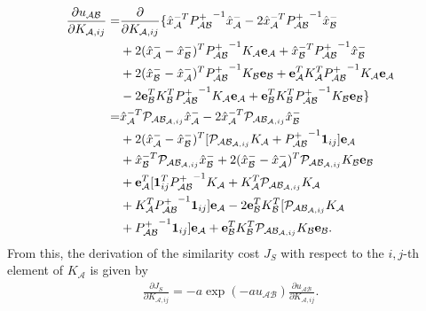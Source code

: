 \documentclass[10pt]{article}
\theoremstyle{plain}\theorembodyfont{\normalfont}
\begin{document}
\begin{align}
\begin{split}
\frac{\partial u_{\mathcal{A}\mathcal{B}}}{\partial K_{\mathcal{A},ij}}
=&\frac{\partial}{\partial K_{\mathcal{A},ij}}\{\hat x_\mathcal{A}^{-T}{P^+_{\mathcal{A}\mathcal{B}}}^{-1}\hat x_\mathcal{A}^-
-2\hat x_\mathcal{A}^{-T}{P^+_{\mathcal{A}\mathcal{B}}}^{-1}\hat x_\mathcal{B}^-
\\
&+2(\hat x_\mathcal{A}^{-}-\hat x_\mathcal{B}^{-})^T{P^+_{\mathcal{A}\mathcal{B}}}^{-1}K_\mathcal{A}{\bf e}_\mathcal{A}
+\hat x_\mathcal{B}^{-T}{P^+_{\mathcal{A}\mathcal{B}}}^{-1}\hat x_\mathcal{B}^-
\\
&+2(\hat x_\mathcal{B}^{-}-\hat x_\mathcal{A}^{-})^T{P^+_{\mathcal{A}\mathcal{B}}}^{-1}K_\mathcal{B}{\bf e}_\mathcal{B}
+{\bf e}_\mathcal{A}^TK_\mathcal{A}^T{P^+_{\mathcal{A}\mathcal{B}}}^{-1}K_\mathcal{A}{\bf e}_\mathcal{A}
\\
&-2{\bf e}_\mathcal{B}^TK_\mathcal{B}^T{P^+_{\mathcal{A}\mathcal{B}}}^{-1}K_\mathcal{A}{\bf e}_\mathcal{A}
+{\bf e}_\mathcal{B}^TK_\mathcal{B}^T{P^+_{\mathcal{A}\mathcal{B}}}^{-1}K_\mathcal{B}{\bf e}_\mathcal{B}\}
\\
=& \hat x_\mathcal{A}^{-T}\mathcal{P}_{\mathcal{A}\mathcal{B}_{\mathcal{A},ij}}\hat x_\mathcal{A}^-
-2\hat x_\mathcal{A}^{-T}\mathcal{P}_{\mathcal{A}\mathcal{B}_{\mathcal{A},ij}}\hat x_\mathcal{B}^-
\\
&+2(\hat x_\mathcal{A}^{-}-\hat x_\mathcal{B}^{-})^T
[\mathcal{P}_{\mathcal{A}\mathcal{B}_{\mathcal{A},ij}}K_\mathcal{A}+{P^+_{\mathcal{A}\mathcal{B}}}^{-1}\mathbf{1}_{ij}]
{\bf e}_\mathcal{A}
\\
&+\hat x_\mathcal{B}^{-T}\mathcal{P}_{\mathcal{A}\mathcal{B}_{\mathcal{A},ij}}\hat x_\mathcal{B}^-
+2(\hat x_\mathcal{B}^{-}-\hat x_\mathcal{A}^{-})^T\mathcal{P}_{\mathcal{A}\mathcal{B}_{\mathcal{A},ij}}K_\mathcal{B}{\bf e}_\mathcal{B}
\\
&+{\bf e}_\mathcal{A}^T[\mathbf{1}_{ij}^T{P^+_{\mathcal{A}\mathcal{B}}}^{-1}K_\mathcal{A}
+K_\mathcal{A}^T\mathcal{P}_{\mathcal{A}\mathcal{B}_{\mathcal{A},ij}}K_\mathcal{A}
\\
&+K_\mathcal{A}^T{P^+_{\mathcal{A}\mathcal{B}}}^{-1}\mathbf{1}_{ij}]{\bf e}_\mathcal{A}
-2{\bf e}_\mathcal{B}^TK_\mathcal{B}^T[\mathcal{P}_{\mathcal{A}\mathcal{B}_{\mathcal{A},ij}}K_\mathcal{A}
\\
&+{P^+_{\mathcal{A}\mathcal{B}}}^{-1}\mathbf{1}_{ij}]{\bf e}_\mathcal{A}
+{\bf e}_\mathcal{B}^TK_\mathcal{B}^T\mathcal{P}_{\mathcal{A}\mathcal{B}_{\mathcal{A},ij}}K_\mathcal{B}{\bf e}_\mathcal{B}.
\end{split}
\end{align}
From this, the derivation of the similarity cost $J_S$ with respect to the $i,j$-th element of $K_\mathcal{A}$ is given by
\begin{align}
\frac{\partial J_{S}}{\partial K_{\mathcal{A},ij}}=-a\exp(-au_{\mathcal{A}\mathcal{B}})\frac{\partial u_{\mathcal{A}\mathcal{B}}}{\partial K_{\mathcal{A},ij}}.\label{eqn:JSK}
\end{align}
\end{document}
